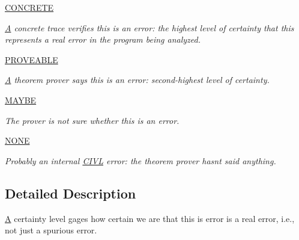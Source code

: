 \begin{DoxyCompactItemize}
\item 
\hypertarget{enumedu_1_1udel_1_1cis_1_1vsl_1_1civl_1_1model_1_1IF_1_1CIVLException_1_1Certainty_a1b0007ee4d847d2f21a2d4e5ea63fe73}{}\hyperlink{enumedu_1_1udel_1_1cis_1_1vsl_1_1civl_1_1model_1_1IF_1_1CIVLException_1_1Certainty_a1b0007ee4d847d2f21a2d4e5ea63fe73}{C\+O\+N\+C\+R\+E\+T\+E}\label{enumedu_1_1udel_1_1cis_1_1vsl_1_1civl_1_1model_1_1IF_1_1CIVLException_1_1Certainty_a1b0007ee4d847d2f21a2d4e5ea63fe73}

\begin{DoxyCompactList}\small\item\em \hyperlink{structA}{A} concrete trace verifies this is an error\+: the highest level of certainty that this represents a real error in the program being analyzed. \end{DoxyCompactList}\item 
\hyperlink{enumedu_1_1udel_1_1cis_1_1vsl_1_1civl_1_1model_1_1IF_1_1CIVLException_1_1Certainty_a35ff314a942b67b0bdf679b069ad40bf}{P\+R\+O\+V\+E\+A\+B\+L\+E}
\begin{DoxyCompactList}\small\item\em \hyperlink{structA}{A} theorem prover says this is an error\+: second-\/highest level of certainty. \end{DoxyCompactList}\item 
\hyperlink{enumedu_1_1udel_1_1cis_1_1vsl_1_1civl_1_1model_1_1IF_1_1CIVLException_1_1Certainty_a851ab28efb94a35e3ff308aa9a5f96ad}{M\+A\+Y\+B\+E}
\begin{DoxyCompactList}\small\item\em The prover is not sure whether this is an error. \end{DoxyCompactList}\item 
\hyperlink{enumedu_1_1udel_1_1cis_1_1vsl_1_1civl_1_1model_1_1IF_1_1CIVLException_1_1Certainty_af60043eefee9873a5c20bb43e541de3e}{N\+O\+N\+E}
\begin{DoxyCompactList}\small\item\em Probably an internal \hyperlink{classedu_1_1udel_1_1cis_1_1vsl_1_1civl_1_1CIVL}{C\+I\+V\+L} error\+: the theorem prover hasn\textquotesingle{}t said anything. \end{DoxyCompactList}\end{DoxyCompactItemize}


\subsection{Detailed Description}
\hyperlink{structA}{A} certainty level gages how certain we are that this is error is a real error, i.\+e., not just a spurious error. 

